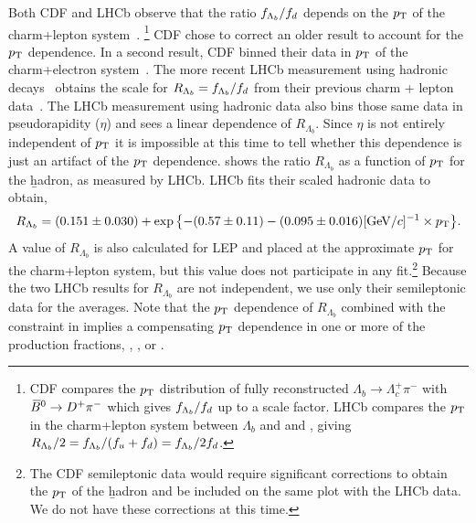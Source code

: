 Both CDF and LHCb observe that the ratio $f_{\Lambda_{b}}/f_{d}$ depends on the $p_{\rm T}$
of the charm+lepton system~\cite{Aaltonen:2008eu,Aaij:2011jp}.
\footnote{
  \label{foot:life_mix:Aaltonen:2008eu}
  CDF compares the $p_{\rm T}$ distribution of fully reconstructed 
  $\Lambda_b\rightarrow\Lambda_c^+ \pi^-$ 
  with $\kern 0.18em\overline{\kern -0.18em B}{}^0\rightarrow D^+\pi^-$ which 
  gives $f_{\Lambda_{b}}/f_{d}$ up to a scale factor. LHCb compares the $p_{\rm T}$ 
  in the charm+lepton system between $\Lambda_b$ and \Bd and \Bu, giving
  $R_{\Lambda_b}/2 = f_{\Lambda_{b}}/(f_{u}+f_{d}) = f_{\Lambda_{b}}/2f_{d}$.}
CDF chose to correct an older result to account for the $p_{\rm T}$ dependence.
In a second result, CDF binned their data in $p_{\rm T}$ of the charm+electron 
system~\cite{Aaltonen:2008zd}.
The more recent LHCb measurement using hadronic decays~\cite{Aaij:2014jyk} 
obtains the scale for $R_{\Lambda_b} = f_{\Lambda_{b}}/f_{d}$ from their previous 
charm + lepton data~\cite{Aaij:2011jp}.  The LHCb measurement using hadronic
data also bins those same data in pseudorapidity ($\eta$) and sees a 
linear dependence of $R_{\Lambda_b}$.  Since $\eta$ is not entirely
independent of $p_{\rm T}$ it is impossible at this time to tell whether 
this dependence is just an artifact of the $p_{\rm T}$ dependence.
 shows the ratio $R_{\Lambda_b}$ as a function of 
$p_{\rm T}$ for the \b hadron, as measured by LHCb.  LHCb fits their
scaled hadronic data to obtain,
\begin{equation}
R_{\Lambda_b} = (0.151\pm 0.030) + 
  \exp{\left\{-(0.57\pm 0.11) - 
  (0.095\pm 0.016)[{\rm GeV}/c]^{-1} \times p_{\rm T}\right\}}.
\end{equation}
A value of
$R_{\Lambda_b}$ is also calculated for LEP and placed at the approximate $p_{\rm T}$ for the charm+lepton
system, but this value does not participate in any fit.\footnote{
  \label{foot:life_mix:Aaltonen:2008zd}
  The CDF semileptonic data would require significant corrections to obtain the $p_{\rm T}$ of the \b hadron and be included on the same plot with the LHCb data.
  We do not have these corrections at this time.}
Because the two LHCb results for $R_{\Lambda_b}$ are not 
independent, we use only their semileptonic data for the averages.
Note that the $p_{\rm T}$ dependence
of $R_{\Lambda_b}$ combined with the constraint in  implies
a compensating $p_{\rm T}$ dependence in one or more of the production fractions, \fBu, \fBd,
or \fBs.

